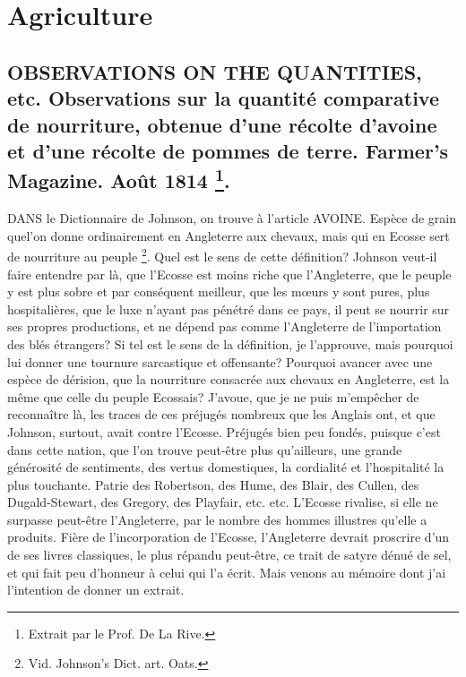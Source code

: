 \setcounter{page}{348}
\chapter{Agriculture}
\section{OBSERVATIONS ON THE QUANTITIES, etc. Observations sur la quantité comparative de nourriture, obtenue d'une récolte d'avoine et d'une récolte de pommes de terre. Farmer's Magazine. Août 1814 \footnote{Extrait par le Prof. De La Rive.}.}
DANS le Dictionnaire de Johnson, on trouve à l'article AVOINE. Espèce de grain quel'on donne ordinairement en Angleterre aux chevaux, mais qui en Ecosse sert de nourriture au peuple \footnote{Vid. Johnson's Dict. art. Oats.}. Quel est le sens de cette définition? Johnson veut-il faire entendre par là, que l'Ecosse est moins riche que l'Angleterre, que le peuple y est plus sobre et par conséquent meilleur, que les mœurs y sont pures, plus hospitalières, que le luxe n'ayant pas pénétré dans ce pays, il peut se nourrir sur ses propres productions, et ne dépend pas comme l'Angleterre de l'importation des blés étrangers? Si tel est le sens de la définition, je l'approuve, mais pourquoi lui donner une tournure sarcastique\setcounter{page}{349} et offensante? Pourquoi avancer avec une espèce de dérision, que la nourriture consacrée aux chevaux en Angleterre, est la même que celle du peuple Ecossais? J'avoue, que je ne puis m'empêcher de reconnaître là, les traces de ces préjugés nombreux que les Anglais ont, et que Johnson, surtout, avait contre l'Ecosse. Préjugés bien peu fondés, puisque c'est dans cette nation, que l'on trouve peut-être plus qu'ailleurs, une grande générosité de sentiments, des vertus domestiques, la cordialité et l'hospitalité la plus touchante. Patrie des Robertson, des Hume, des Blair, des Cullen, des Dugald-Stewart, des Gregory, des Playfair, etc. etc. L'Ecosse rivalise, si elle ne surpasse peut-être l'Angleterre, par le nombre des hommes illustres qu'elle a produits. Fière de l'incorporation de l'Ecosse, l'Angleterre devrait proscrire d'un de ses livres classiques, le plus répandu peut-être, ce trait de satyre dénué de sel, et qui fait peu d'honneur à celui qui l'a écrit. Mais venons au mémoire dont j'ai l'intention de donner un extrait.
